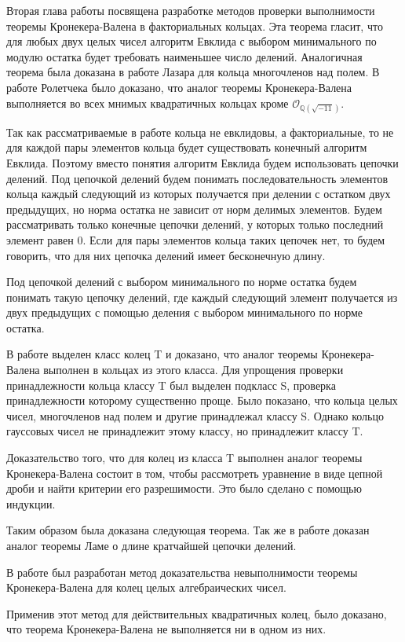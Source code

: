 \documentclass[a4paper,12pt]{article} %
\begin{document}
Вторая глава работы посвящена разработке методов проверки выполнимости теоремы Кронекера-Валена в факториальных кольцах.
Эта теорема гласит, что для любых двух целых чисел алгоритм Евклида с выбором минимального по модулю остатка будет требовать наименьшее число делений.
Аналогичная теорема была доказана в работе Лазара для кольца многочленов над полем.
В работе Ролетчека было доказано, что аналог теоремы Кронекера-Валена выполняется во всех мнимых квадратичных кольцах кроме $\mathcal{O}_{\mathbb{Q}(\sqrt{-11})}$.
    
Так как рассматриваемые в работе кольца не евклидовы, а факториальные, то не для каждой пары элементов кольца будет существовать конечный алгоритм Евклида.
Поэтому вместо понятия алгоритм Евклида будем использовать цепочки делений.
Под цепочкой делений будем понимать последовательность элементов кольца каждый следующий из которых получается при делении с остатком двух предыдущих, но норма остатка не зависит от норм делимых элементов.
Будем рассматривать только конечные цепочки делений, у которых только последний элемент равен $0$.
Если для пары элементов кольца таких цепочек нет, то будем говорить, что для них цепочка делений имеет бесконечную длину.
    
Под цепочкой делений с выбором минимального по норме остатка будем понимать такую цепочку делений, где каждый следующий элемент получается из двух предыдущих с помощью деления с выбором минимального по норме остатка.

В работе выделен класс колец T и доказано, что аналог теоремы Кронекера-Валена выполнен в кольцах из этого класса.
Для упрощения проверки принадлежности кольца классу T был выделен подкласс S, проверка принадлежности которому существенно проще.
Было показано, что кольца целых чисел, многочленов над полем и другие принадлежал классу S.
Однако кольцо гауссовых чисел не принадлежит этому классу, но принадлежит классу T.

Доказательство того, что для колец из класса T выполнен аналог теоремы Кронекера-Валена состоит в том, чтобы рассмотреть уравнение в виде цепной дроби и найти критерии его разрешимости.
Это было сделано с помощью индукции.

Таким образом была доказана следующая теорема.
Так же в работе доказан аналог теоремы Ламе о длине кратчайшей цепочки делений.

В работе был разработан метод доказательства невыполнимости теоремы Кронекера-Валена для колец целых алгебраических чисел.

Применив этот метод для действительных квадратичных колец, было доказано, что теорема Кронекера-Валена не выполняется ни в одном из них.
\end{document}
